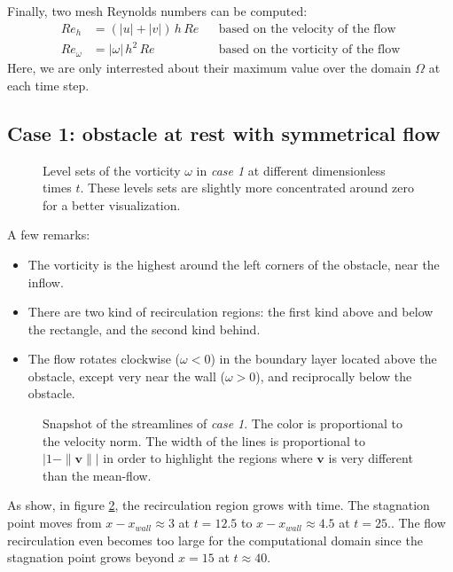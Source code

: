 \documentclass[11 pt]{article}
\begin{document}
Finally, two mesh Reynolds numbers can be computed:
\begin{align}
    Re_h &= (|u|+|v|) \,h \, Re && \text{based on the velocity of the flow}\\
    Re_{\omega} &= |\omega| \,h^2 \, Re && \text{based on the vorticity of the flow}
\end{align}
Here, we are only interrested about their maximum value over the domain $\Omega$ at each time step.



\subsection{Case 1: obstacle at rest with symmetrical flow}

\begin{figure}[H]
    \centering
    
    \caption{Level sets of the vorticity $\omega$ in \textit{case 1} at different dimensionless times $t$. These levels sets are slightly more concentrated around zero for a better visualization.}
    \label{fig:vorticity_1}
\end{figure}

A few remarks:
\begin{itemize}
    \item The vorticity is the highest around the left corners of the obstacle, near the inflow.
    \item There are two kind of recirculation regions: the first kind above and below the rectangle, and the second kind behind.
    \item The flow rotates clockwise ($\omega < 0$) in the boundary layer located above the obstacle, except very near the wall ($\omega > 0$), and reciprocally below the obstacle.
\end{itemize}

\begin{figure}[H]
    \centering
    
    \caption{Snapshot of the streamlines of \textit{case 1}. The color is proportional to the velocity norm. The width of the lines is proportional to $\left|1 - \|\mathbf{v}\|\right|$ in order to highlight the regions where $\mathbf{v}$ is very different than the mean-flow.}
    \label{fig:streamlines_1}
\end{figure}
As show, in figure \ref{fig:streamlines_1}, the recirculation region grows with time. The stagnation point moves from $x-x_{wall} \approx 3$ at $t=12.5$ to $x - x_{wall} \approx 4.5$ at $t=25.$. The flow recirculation even becomes too large for the computational domain since the stagnation point grows beyond $x=15$ at $t \approx 40$.
\end{document}
